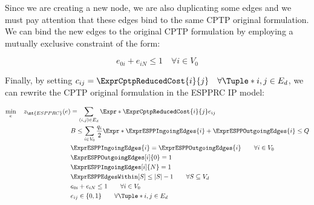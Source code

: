 Since we are creating a new node, we are also duplicating some edges and we must pay attention that these edges bind to the same CPTP original formulation.
We can bind the new edges to the original CPTP formulation by employing a mutually exclusive constraint of the form:

\begin{equation}
	e_{0i} + e_{iN} \le 1 \quad \forall i \in V_0
\end{equation}

Finally, by setting $c_{ij} = \ExprCptpReducedCost{i}{j} \quad \forall \Tuple*{i, j} \in E_d$, we can rewrite the CPTP original formulation in the ESPPRC IP model:

\begin{align}
	\min_{e} \quad z_\mt{ESPPRC}(e) & =  \sum_{(i, j) \in E_d} \Expr*{ \ExprCptpReducedCost{i}{j} } e_{ij} \label{eq:aB:espprc-obj-function}                                                                                            \\
	                                & B \le \sum_{i \in V_0} \frac{q_i}{2} \Expr*{ \ExprESPPIngoingEdges{i} + \ExprESPPOutgoingEdges{i} }  \le Q                            \label{eq:aB:espprc-resource-upper-bound-constraint}        \\
	                                & \ExprESPPIngoingEdges{i} = \ExprESPPOutgoingEdges{i}                                                \qquad \forall i \in V_0          \label{eq:aB:espprc-flow-conservation-constraint-customers} \\
	                                & \ExprESPPOutgoingEdges[i]{0} = 1                                                                                                      \label{eq:aB:espprc-flow-conservation-constraint-depot1}    \\
	                                & \ExprESPPIngoingEdges[i]{N} = 1                                                                                                       \label{eq:aB:espprc-flow-conservation-constraint-depot2}    \\
	                                & \ExprESPPEdgesWithin[S] \le |S| - 1                                                                  \qquad \forall S \subseteq V_d   \label{eq:aB:espprc-sec-constraints}                        \\
	                                & e_{0i} + e_{iN} \le 1                                                                                \qquad \forall i \in V_0         \label{eq:aB:espprc-cptp-binding}                           \\
	                                & e_{ij}                   \in \lbrace 0, 1 \rbrace                                                    \qquad \forall \Tuple*{i, j} \in E_d    \label{eq:aB:espprc-e-mip-var-bounds}                \\
\end{align}

